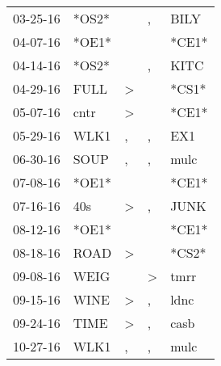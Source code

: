 \begin{supertabular}{p{0.07\textwidth}p{0.06\textwidth}p{0.02\textwidth}p{0.02\textwidth}p{0.06\textwidth}}
          03-25-16\textsuperscript{} &                            *OS2* &                  &             , &  BILY\textsuperscript{} \\
          04-07-16\textsuperscript{} &                            *OE1* &                  &               &                   *CE1* \\
          04-14-16\textsuperscript{} &                            *OS2* &                  &             , &  KITC\textsuperscript{} \\
          04-29-16\textsuperscript{} &           FULL\textsuperscript{} &     \textgreater &               &                   *CS1* \\
          05-07-16\textsuperscript{} &           cntr\textsuperscript{} &     \textgreater &               &                   *CE1* \\
          05-29-16\textsuperscript{} &           WLK1\textsuperscript{} &                , &             , &   EX1\textsuperscript{} \\
          06-30-16\textsuperscript{} &           SOUP\textsuperscript{} &                , &             , &  mulc\textsuperscript{} \\
          07-08-16\textsuperscript{} &                            *OE1* &                  &               &                   *CE1* \\
          07-16-16\textsuperscript{} &            40s\textsuperscript{} &     \textgreater &             , &  JUNK\textsuperscript{} \\
          08-12-16\textsuperscript{} &                            *OE1* &                  &               &                   *CE1* \\
          08-18-16\textsuperscript{} &           ROAD\textsuperscript{} &     \textgreater &               &                   *CS2* \\
          09-08-16\textsuperscript{} &           WEIG\textsuperscript{} &                  &  \textgreater &  tmrr\textsuperscript{} \\
          09-15-16\textsuperscript{} &           WINE\textsuperscript{} &     \textgreater &             , &  ldnc\textsuperscript{} \\
          09-24-16\textsuperscript{} &           TIME\textsuperscript{} &     \textgreater &             , &  casb\textsuperscript{} \\
          10-27-16\textsuperscript{} &           WLK1\textsuperscript{} &                , &             , &  mulc\textsuperscript{} \\

\end{supertabular}
